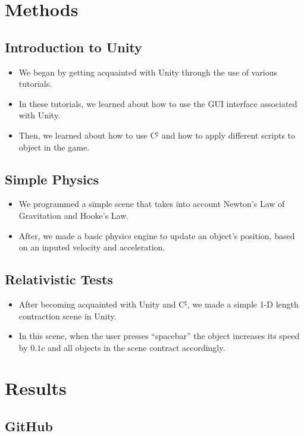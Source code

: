 \documentclass[12pt]{article}
\newcommand{\csharp}{C$^\sharp$}
\begin{document}
\section{Methods}
\subsection{Introduction to Unity}
\begin{itemize}
	\item We began by getting acquainted with Unity through the use of various tutorials.
	\item In these tutorials, we learned about how to use the GUI interface associated with Unity.
	\item Then, we learned about how to use \csharp{} and how to apply different scripts to object in the game.
\end{itemize}

\subsection{Simple Physics}
\begin{itemize}
	\item We programmed a simple scene that takes into account Newton's Law of Gravitation and Hooke's Law.
	\item After, we made a basic physics engine to update an object's position, based on an inputed velocity and acceleration.
\end{itemize}

\subsection{Relativistic Tests}
\begin{itemize}
	\item After becoming acquainted with Unity and \csharp{}, we made a simple 1-D length contraction scene in Unity. 
	\item In this scene, when the user presses \enquote{spacebar} the object increases its speed by $0.1c$ and all objects in the scene contract accordingly.
\end{itemize}

\section{Results}

\subsection{GitHub}
\end{document}

